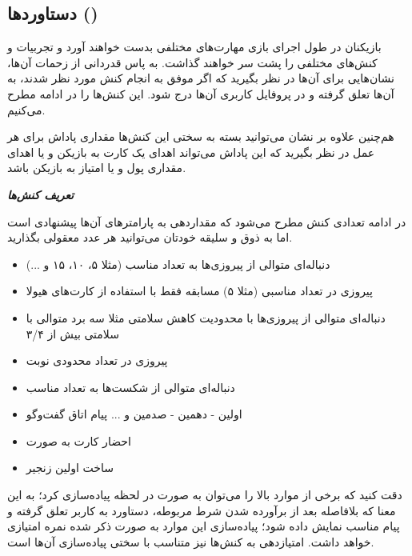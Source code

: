 \documentclass[]{article}
\begin{document}
\subsection*{{\titr دستاورد‌ها ()}}

بازیکنان در طول اجرای بازی مهارت‌های مختلفی بدست خواهند آورد و تجربیات و کنش‌های مختلفی را پشت سر خواهند گذاشت. به پاس قدردانی از زحمات آن‌ها، نشان‌هایی برای آن‌ها در نظر بگیرید که اگر موفق به انجام کنش مورد نظر شدند، به آن‌ها تعلق گرفته و در پروفایل کاربری آن‌ها درج شود. این کنش‌ها را در ادامه مطرح می‌کنیم.

هم‌چنین علاوه بر نشان می‌توانید بسته به سختی این کنش‌ها مقداری پاداش برای هر عمل در نظر بگیرید که این پاداش می‌تواند اهدای یک کارت به بازیکن و یا اهدای مقداری پول و یا امتیاز به بازیکن باشد.

\textbf{\emph{تعریف کنش‌ها}}

در ادامه تعدادی کنش مطرح می‌شود که مقداردهی به پارامترهای آن‌ها پیشنهادی است اما به ذوق و سلیقه خودتان می‌توانید هر عدد معقولی بگذارید.

\begin{itemize}
	\item دنباله‌ای متوالی از پیروزی‌ها به تعداد مناسب‌ (مثلا ۵، ۱۰، ۱۵ و ...)
	\item پیروزی در تعداد مناسبی‌ (مثلا ۵) مسابقه فقط با استفاده از کارت‌های هیولا
	\item دنباله‌ای متوالی از پیروزی‌ها با محدودیت کاهش سلامتی مثلا سه برد متوالی با سلامتی بیش از ۳/۴
	\item پیروزی در تعداد محدودی نوبت
	\item دنباله‌ای متوالی از شکست‌ها به تعداد مناسب
	\item اولین - دهمین - صدمین و ... پیام اتاق گفت‌وگو
	\item احضار کارت به صورت 
	\item ساخت اولین زنجیر
\end{itemize}


\begin{tcolorbox}[colback=green!5!white,colframe=green!75!black,title=\textbf{نکته}]
	دقت کنید که برخی از موارد بالا را می‌توان به صورت در لحظه  پیاده‌سازی کرد؛ به این معنا که بلافاصله بعد از برآورده شدن شرط مربوطه، دستاورد به کاربر تعلق گرفته و پیام مناسب نمایش داده شود؛ پیاده‌سازی این موارد به صورت ذکر شده نمره امتیازی خواهد داشت. امتیازدهی به کنش‌ها نیز متناسب با سختی پیاده‌سازی آن‌ها است.
\end{tcolorbox}
\end{document}
